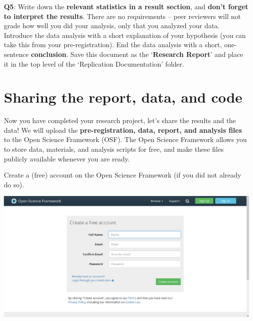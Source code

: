 \documentclass[
  oneside]{book}
\begin{document}
\textbf{Q5}: Write down the \textbf{relevant statistics in a result section}, and \textbf{don't forget to interpret the results}. There are no requirements -- peer reviewers will not grade how well you did your analysis, only that you analyzed your data. Introduce the data analysis with a short explanation of your hypothesis (you can take this from your pre-registration). End the data analysis with a short, one-sentence \textbf{conclusion}. Save this document as the `\textbf{Research Report}' and place it in the top level of the `Replication Documentation' folder.

\hypertarget{sharing-the-report-data-and-code}{%
\section{Sharing the report, data, and code}\label{sharing-the-report-data-and-code}}

Now you have completed your research project, let's share the results and the data! We will upload the \textbf{pre-registration, data, report, and analysis files} to the Open Science Framework (OSF). The Open Science Framework allows you to store data, materials, and analysis scripts for free, and make these files publicly available whenever you are ready.

Create a (free) account on the Open Science Framework (if you did not already do
so).

\begin{center}\includegraphics[width=1\linewidth]{images/7d6b26f83fee88df8bd46f30f4441844} \end{center}
\end{document}
